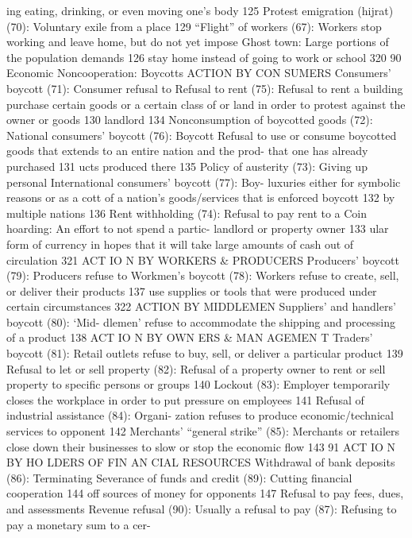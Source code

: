 \documentclass[twoside,a4paper,12pt,fleqn,openany]{extbook}
\begin{document}
ing eating, drinking, or even moving one’s
body
 125
 Protest emigration (hijrat) (70): Voluntary exile
from a place
 129
“Flight” of workers (67): Workers stop working
and leave home, but do not yet impose
 Ghost town: Large portions of the population
demands
 126
 stay home instead of going to work or school		
320
90
Economic Noncooperation: Boycotts
ACTION BY CON SUMERS
Consumers’ boycott (71): Consumer refusal to
 Refusal to rent (75): Refusal to rent a building
purchase certain goods or a certain class of
 or land in order to protest against the owner or
goods
 130
 landlord
 134
Nonconsumption of boycotted goods (72):
 National consumers’ boycott (76): Boycott
Refusal to use or consume boycotted goods
 that extends to an entire nation and the prod-
that one has already purchased
 131
 ucts produced there
 135
Policy of austerity (73): Giving up personal
 International consumers’ boycott (77): Boy-
luxuries either for symbolic reasons or as a
 cott of a nation’s goods/services that is enforced
boycott
 132
 by multiple nations
 136
Rent withholding (74): Refusal to pay rent to a
 Coin hoarding: An effort to not spend a partic-
landlord or property owner
 133
 ular form of currency in hopes that it will take
large amounts of cash out of circulation 321
ACT IO N BY WORKERS & PRODUCERS
Producers’ boycott (79): Producers refuse to
 Workmen’s boycott (78): Workers refuse to
create, sell, or deliver their products
 137
 use supplies or tools that were produced under
certain circumstances
 322
ACTION BY MIDDLEMEN
Suppliers’ and handlers’ boycott (80): ‘Mid-
dlemen’ refuse to accommodate the shipping
and processing of a product
 138
ACT IO N BY OWN ERS & MAN AGEMEN T
Traders’ boycott (81): Retail outlets refuse to
buy, sell, or deliver a particular product 139
Refusal to let or sell property (82): Refusal of
a property owner to rent or sell property to
specific persons or groups
 140
Lockout (83): Employer temporarily closes
the workplace in order to put pressure on
employees
 141
Refusal of industrial assistance (84): Organi-
zation refuses to produce economic/technical
services to opponent
 142
Merchants’ “general strike” (85): Merchants
or retailers close down their businesses to slow
or stop the economic flow
 143
91
ACT IO N BY HO LDERS OF FIN AN CIAL RESOURCES
Withdrawal of bank deposits (86): Terminating
 Severance of funds and credit (89): Cutting
financial cooperation
 144
 off sources of money for opponents
 147
Refusal to pay fees, dues, and assessments
 Revenue refusal (90): Usually a refusal to pay
(87): Refusing to pay a monetary sum to a cer-
\end{document}
